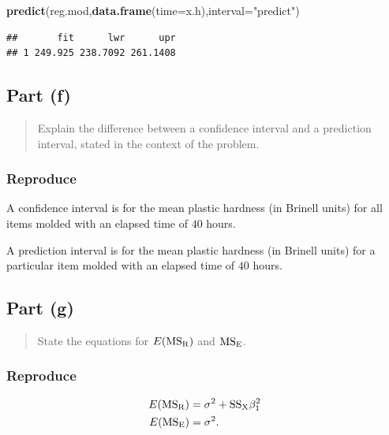 \documentclass[
]{article}
\newenvironment{Shaded}{\begin{snugshade}}{\end{snugshade}}
\newcommand{\AttributeTok}[1]{\textcolor[rgb]{0.13,0.29,0.53}{#1}}
\newcommand{\FunctionTok}[1]{\textcolor[rgb]{0.13,0.29,0.53}{\textbf{#1}}}
\newcommand{\NormalTok}[1]{#1}
\newcommand{\StringTok}[1]{\textcolor[rgb]{0.31,0.60,0.02}{#1}}
\begin{document}
\begin{Shaded}
\begin{Highlighting}[]
\FunctionTok{predict}\NormalTok{(reg.mod,}\FunctionTok{data.frame}\NormalTok{(}\AttributeTok{time=}\NormalTok{x.h),}\AttributeTok{interval=}\StringTok{"predict"}\NormalTok{)}
\end{Highlighting}
\end{Shaded}

\begin{verbatim}
##       fit      lwr      upr
## 1 249.925 238.7092 261.1408
\end{verbatim}

\hypertarget{part-f}{%
\subsection{Part (f)}\label{part-f}}

\begin{quote}
Explain the difference between a confidence interval and a prediction
interval, stated in the context of the problem.
\end{quote}

\hypertarget{reproduce-3}{%
\subsubsection{Reproduce}\label{reproduce-3}}

A confidence interval is for the mean plastic hardness (in Brinell
units) for all items molded with an elapsed time of \(40\) hours.

A prediction interval is for the mean plastic hardness (in Brinell
units) for a particular item molded with an elapsed time of \(40\)
hours.

\hypertarget{part-g}{%
\subsection{Part (g)}\label{part-g}}

\begin{quote}
State the equations for \(E(\mathrm{MS_{R}})\) and \(\mathrm{MS_{E}}\).
\end{quote}

\hypertarget{reproduce-4}{%
\subsubsection{Reproduce}\label{reproduce-4}}

\begin{align*}
  E(\mathrm{MS_{R}}) &= \sigma^2 + \mathrm{SS_{X}} \beta_1^2\\
  E(\mathrm{MS_{E}}) &= \sigma^2.
\end{align*}
\end{document}
